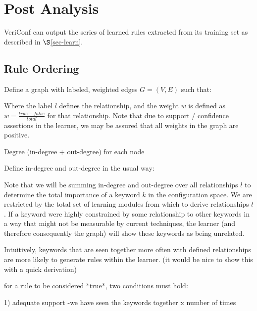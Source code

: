 
\section{Post Analysis}

VeriConf can output the series of learned rules extracted from its training
set as described in $\S$\ref{sec-learn}.

\subsection{Rule Ordering}


Define a graph with labeled, weighted edges $G = (V,E)$ such that:
\iffalse
    V \def { keywords }

Where 

    E \def { (v_1, v_2, l, w) }
\fi

Where the label $l$ defines the relationship, and the weight $w$ is
defined as $w = \frac{true - false}{total}$ for that relationship.
Note that due to support / confidence assertions in the learner, we
may be assured that all weights in the graph are positive.

Degree (in-degree + out-degree) for each node 

Define in-degree and out-degree in the usual way:

\iffalse    IN_DEGREE(k) = ||

    $\forall keyword k \in rules, in\_degree()$
\fi

Note that we will be summing in-degree and out-degree over all
relationships $l$ to determine the total importance of
a keyword $k$ in the configuration space. We are restricted
by the total set of learning modules from which to derive
relationships $l$. If a keyword were highly constrained by some
relationship to other keywords in a way that might not be
measurable by current techniques, the learner (and therefore
consequently the graph) will show these keywords as being
unrelated.

Intuitively, keywords that are seen together more often with defined relationships are more likely to generate rules within the learner.
 (it would be nice to show this with a quick derivation)

for a rule to be considered *true*, two conditions must hold:

1) adequate support -we have seen the keywords together x number of times

